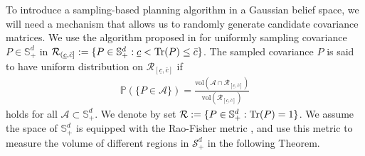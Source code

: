 \documentclass[Afour,sageh,times]{sagej}
\newcommand{\bm}{{\bf m}}
\newcommand{\bt}{{\bf t}}
\newcommand{\bM}{{\bf M}}
\newtheorem{remark}{\bf Remark}
\begin{document}
To introduce a sampling-based planning algorithm in a Gaussian belief space, we will need a mechanism that allows us to randomly generate candidate covariance matrices. We use the algorithm proposed in \cite{mittelbach2012sampling} for uniformly sampling covariance $P\in \mathbb{S}^d_{+}$ in  $\mathcal{R}_{(\underline{c},\bar{c}]}:=\{P\in \mathbb{S}^d_{+}: \underline{c} < \textup{Tr}(P)\leq \bar{c}\}$. The sampled covariance $P$ is said to have uniform distribution  on $\mathcal{R}_{[\underline{c},\bar{c}]}$ if
\begin{align} \label{eq:uniform_sampling}
    \mathbb{P}(\{P\in\mathcal{A}\})=\frac{\text{vol}(\mathcal{A}\cap \mathcal{R}_{[\underline{c}, \bar{c} ]})}{\text{vol}(\mathcal{R}_{[\underline{c} ,\bar{c} ]})}
\end{align}
holds for all $\mathcal{A} \subset \mathbb{S}^{d}_+$. We denote by set $\mathcal{R}:=\{P\in \mathbb{S}^d_{+}: \textup{Tr}(P)=1\}$. 
We assume the space of $\mathbb{S}^d_{+}$ is equipped with the Rao-Fisher metric \cite{terras2012harmonic}, and use this metric to measure the volume of different regions in $\mathcal{S}^d_{+}$ in the following Theorem. 
\end{document}
